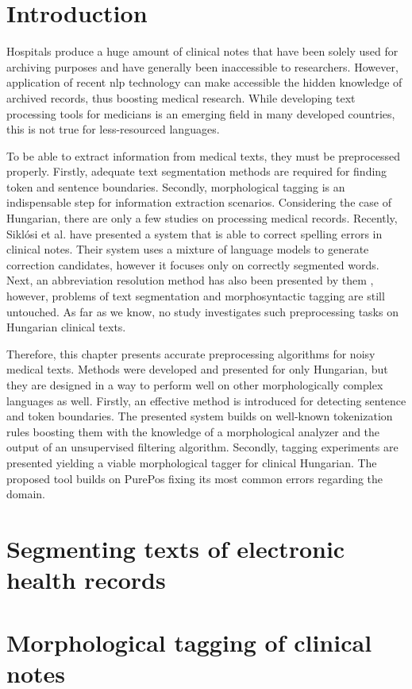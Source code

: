 
\section{Introduction}

Hospitals produce a huge amount of clinical notes that have been solely used for archiving purposes and have generally been inaccessible to researchers. 
However, application of recent \acrshort{nlp} technology can make accessible the hidden knowledge of archived records, thus boosting medical research. 
While developing text processing tools for medicians is an emerging field in many developed countries, this is not true for less-resourced languages.

To be able to extract information from medical texts, they must be preprocessed properly. 
Firstly, adequate text segmentation methods 
are required for finding token and sentence boundaries. 
Secondly, morphological tagging is an indispensable step for information extraction scenarios. 
Considering the case of Hungarian, there are only a few studies on processing medical records. 
Recently, Siklósi et al. \cite{Siklosi2012,Siklosi2013} have presented a system that is able to correct spelling errors in clinical notes. 
Their system uses a mixture of language models to generate correction candidates, however it focuses only on correctly segmented words. 
Next, an abbreviation resolution method has also been presented by them \cite{Siklosi2013b}, however, problems of text segmentation and  morphosyntactic tagging are still untouched. 
As far as we know, no study investigates such preprocessing tasks on Hungarian clinical texts. 

Therefore, this chapter presents accurate preprocessing algorithms for noisy medical texts.
Methods were developed and presented for only Hungarian, but they are designed in a way to perform well on other morphologically complex languages as well. 
Firstly, an effective method is introduced for detecting sentence and token boundaries.
The presented system builds on well-known tokenization rules boosting them with the knowledge of a morphological analyzer and the output of an unsupervised filtering algorithm.
Secondly, tagging experiments are presented yielding a viable morphological tagger for clinical Hungarian. 
The proposed tool builds on PurePos fixing its most common errors regarding the domain.

\section{Segmenting texts of electronic health records}\label{sec:clin_segm}


\pagebreak

\section{Morphological tagging of clinical notes}\label{sec:clin_tag}


